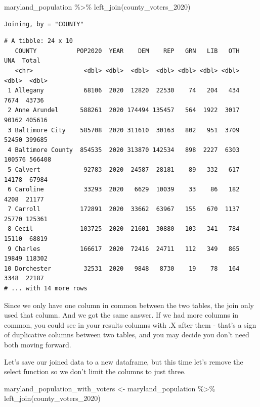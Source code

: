 \documentclass[
  letterpaper,
  DIV=11,
  numbers=noendperiod]{scrreprt}
\newenvironment{Shaded}{\begin{snugshade}}{\end{snugshade}}
\newcommand{\FunctionTok}[1]{\textcolor[rgb]{0.28,0.35,0.67}{#1}}
\newcommand{\NormalTok}[1]{\textcolor[rgb]{0.00,0.23,0.31}{#1}}
\newcommand{\OtherTok}[1]{\textcolor[rgb]{0.00,0.23,0.31}{#1}}
\newcommand{\SpecialCharTok}[1]{\textcolor[rgb]{0.37,0.37,0.37}{#1}}
\begin{document}
\begin{Shaded}
\begin{Highlighting}[]
\NormalTok{maryland\_population }\SpecialCharTok{\%\textgreater{}\%} \FunctionTok{left\_join}\NormalTok{(county\_voters\_2020)}
\end{Highlighting}
\end{Shaded}

\begin{verbatim}
Joining, by = "COUNTY"
\end{verbatim}

\begin{verbatim}
# A tibble: 24 x 10
   COUNTY           POP2020  YEAR    DEM    REP   GRN   LIB   OTH    UNA  Total
   <chr>              <dbl> <dbl>  <dbl>  <dbl> <dbl> <dbl> <dbl>  <dbl>  <dbl>
 1 Allegany           68106  2020  12820  22530    74   204   434   7674  43736
 2 Anne Arundel      588261  2020 174494 135457   564  1922  3017  90162 405616
 3 Baltimore City    585708  2020 311610  30163   802   951  3709  52450 399685
 4 Baltimore County  854535  2020 313870 142534   898  2227  6303 100576 566408
 5 Calvert            92783  2020  24587  28181    89   332   617  14178  67984
 6 Caroline           33293  2020   6629  10039    33    86   182   4208  21177
 7 Carroll           172891  2020  33662  63967   155   670  1137  25770 125361
 8 Cecil             103725  2020  21601  30880   103   341   784  15110  68819
 9 Charles           166617  2020  72416  24711   112   349   865  19849 118302
10 Dorchester         32531  2020   9848   8730    19    78   164   3348  22187
# ... with 14 more rows
\end{verbatim}

Since we only have one column in common between the two tables, the join
only used that column. And we got the same answer. If we had more
columns in common, you could see in your results columns with .X after
them - that's a sign of duplicative columns between two tables, and you
may decide you don't need both moving forward.

Let's save our joined data to a new dataframe, but this time let's
remove the select function so we don't limit the columns to just three.

\begin{Shaded}
\begin{Highlighting}[]
\NormalTok{maryland\_population\_with\_voters }\OtherTok{\textless{}{-}}\NormalTok{ maryland\_population }\SpecialCharTok{\%\textgreater{}\%} \FunctionTok{left\_join}\NormalTok{(county\_voters\_2020)}
\end{Highlighting}
\end{Shaded}
\end{document}
